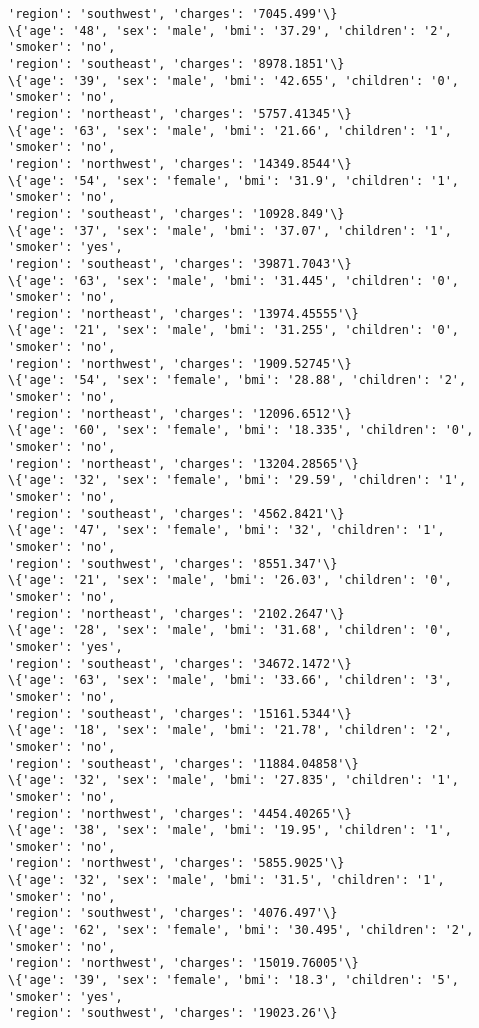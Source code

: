 \documentclass[11pt]{article}
\begin{document}
\begin{Verbatim}[commandchars=\\\{\}]
'region': 'southwest', 'charges': '7045.499'\}
\{'age': '48', 'sex': 'male', 'bmi': '37.29', 'children': '2', 'smoker': 'no',
'region': 'southeast', 'charges': '8978.1851'\}
\{'age': '39', 'sex': 'male', 'bmi': '42.655', 'children': '0', 'smoker': 'no',
'region': 'northeast', 'charges': '5757.41345'\}
\{'age': '63', 'sex': 'male', 'bmi': '21.66', 'children': '1', 'smoker': 'no',
'region': 'northwest', 'charges': '14349.8544'\}
\{'age': '54', 'sex': 'female', 'bmi': '31.9', 'children': '1', 'smoker': 'no',
'region': 'southeast', 'charges': '10928.849'\}
\{'age': '37', 'sex': 'male', 'bmi': '37.07', 'children': '1', 'smoker': 'yes',
'region': 'southeast', 'charges': '39871.7043'\}
\{'age': '63', 'sex': 'male', 'bmi': '31.445', 'children': '0', 'smoker': 'no',
'region': 'northeast', 'charges': '13974.45555'\}
\{'age': '21', 'sex': 'male', 'bmi': '31.255', 'children': '0', 'smoker': 'no',
'region': 'northwest', 'charges': '1909.52745'\}
\{'age': '54', 'sex': 'female', 'bmi': '28.88', 'children': '2', 'smoker': 'no',
'region': 'northeast', 'charges': '12096.6512'\}
\{'age': '60', 'sex': 'female', 'bmi': '18.335', 'children': '0', 'smoker': 'no',
'region': 'northeast', 'charges': '13204.28565'\}
\{'age': '32', 'sex': 'female', 'bmi': '29.59', 'children': '1', 'smoker': 'no',
'region': 'southeast', 'charges': '4562.8421'\}
\{'age': '47', 'sex': 'female', 'bmi': '32', 'children': '1', 'smoker': 'no',
'region': 'southwest', 'charges': '8551.347'\}
\{'age': '21', 'sex': 'male', 'bmi': '26.03', 'children': '0', 'smoker': 'no',
'region': 'northeast', 'charges': '2102.2647'\}
\{'age': '28', 'sex': 'male', 'bmi': '31.68', 'children': '0', 'smoker': 'yes',
'region': 'southeast', 'charges': '34672.1472'\}
\{'age': '63', 'sex': 'male', 'bmi': '33.66', 'children': '3', 'smoker': 'no',
'region': 'southeast', 'charges': '15161.5344'\}
\{'age': '18', 'sex': 'male', 'bmi': '21.78', 'children': '2', 'smoker': 'no',
'region': 'southeast', 'charges': '11884.04858'\}
\{'age': '32', 'sex': 'male', 'bmi': '27.835', 'children': '1', 'smoker': 'no',
'region': 'northwest', 'charges': '4454.40265'\}
\{'age': '38', 'sex': 'male', 'bmi': '19.95', 'children': '1', 'smoker': 'no',
'region': 'northwest', 'charges': '5855.9025'\}
\{'age': '32', 'sex': 'male', 'bmi': '31.5', 'children': '1', 'smoker': 'no',
'region': 'southwest', 'charges': '4076.497'\}
\{'age': '62', 'sex': 'female', 'bmi': '30.495', 'children': '2', 'smoker': 'no',
'region': 'northwest', 'charges': '15019.76005'\}
\{'age': '39', 'sex': 'female', 'bmi': '18.3', 'children': '5', 'smoker': 'yes',
'region': 'southwest', 'charges': '19023.26'\}

\end{Verbatim}
\end{document}
